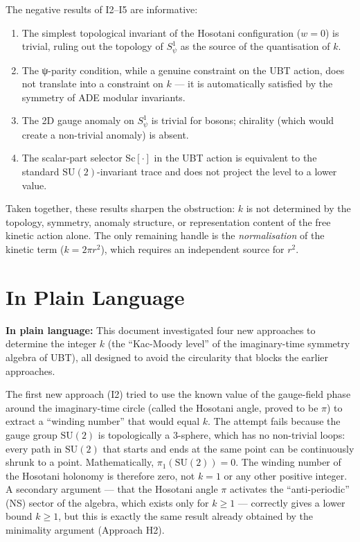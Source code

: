 \documentclass[11pt,a4paper]{article}
\theoremstyle{definition}
\theoremstyle{remark}
\begin{document}
The negative results of I2--I5 are informative:
\begin{enumerate}
  \item The simplest topological invariant of the Hosotani configuration
    ($w = 0$) is trivial, ruling out the topology of $S^1_\psi$ as the
    source of the quantisation of $k$.
  \item The ψ-parity condition, while a genuine constraint on the
    UBT action, does not translate into a constraint on $k$ — it is
    automatically satisfied by the symmetry of ADE modular invariants.
  \item The 2D gauge anomaly on $S^1_\psi$ is trivial for bosons;
    chirality (which would create a non-trivial anomaly) is absent.
  \item The scalar-part selector Sc$[\cdot]$ in the UBT action is
    equivalent to the standard $\mathrm{SU}(2)$-invariant trace and
    does not project the level to a lower value.
\end{enumerate}
Taken together, these results sharpen the obstruction: $k$ is not
determined by the topology, symmetry, anomaly structure, or
representation content of the free kinetic action alone.
The only remaining handle is the \emph{normalisation} of the kinetic
term ($k = 2\pi r^2$), which requires an independent source for
$r^2$.

\section{In Plain Language}
\label{sec:plain}

\textbf{In plain language:}
This document investigated four new approaches to determine the integer
$k$ (the ``Kac-Moody level'' of the imaginary-time symmetry algebra of
UBT), all designed to avoid the circularity that blocks the earlier
approaches.

The first new approach (I2) tried to use the known value of the
gauge-field phase around the imaginary-time circle (called the
Hosotani angle, proved to be $\pi$) to extract a ``winding number''
that would equal $k$.
The attempt fails because the gauge group $\mathrm{SU}(2)$ is
topologically a 3-sphere, which has no non-trivial loops:
every path in $\mathrm{SU}(2)$ that starts and ends at the same point
can be continuously shrunk to a point.
Mathematically, $\pi_1(\mathrm{SU}(2)) = 0$.
The winding number of the Hosotani holonomy is therefore zero,
not $k = 1$ or any other positive integer.
A secondary argument — that the Hosotani angle $\pi$ activates the
``anti-periodic'' (NS) sector of the algebra, which exists only for
$k \geq 1$ — correctly gives a lower bound $k \geq 1$, but this is
exactly the same result already obtained by the minimality argument
(Approach H2).
\end{document}
